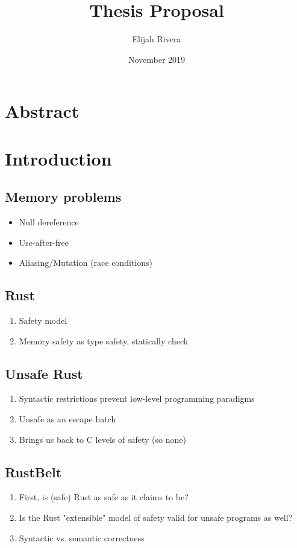\documentclass{article}
\title{Thesis Proposal}
\author{Elijah Rivera}
\date{November 2019}
\begin{document}
\maketitle

\section{Abstract}

\section{Introduction}
\subsection{Memory problems}
\begin{itemize}
    \item Null dereference
    \item Use-after-free
    \item Aliasing/Mutation (race conditions)
\end{itemize}

\subsection{Rust}
\begin{enumerate}
    \item Safety model
    \item Memory safety as type safety, statically check
\end{enumerate}

\subsection{Unsafe Rust}
\begin{enumerate}
    \item Syntactic restrictions prevent low-level programming paradigms
    \item Unsafe as an escape hatch
    \item Brings us back to C levels of safety (so none)
\end{enumerate}

\subsection{RustBelt}
\begin{enumerate}
    \item First, is (safe) Rust as safe as it claims to be?
    \item Is the Rust "extensible" model of safety valid for unsafe programs as well?
    \item Syntactic vs. semantic correctness
\end{enumerate}
\end{document}
